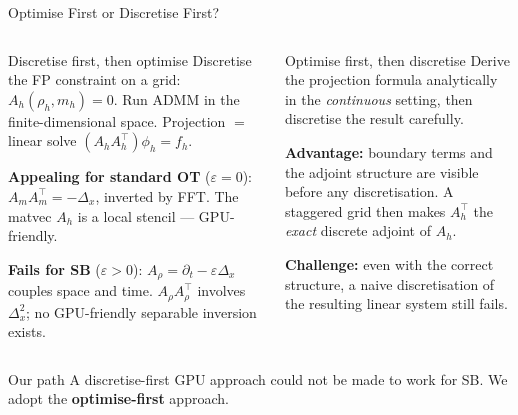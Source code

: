 \documentclass[10pt,aspectratio=169]{beamer}
\newcommand{\eps}{\varepsilon}
\newcommand{\Lapx}{\Delta_x}          %
\newcommand{\Bihar}{\Delta_x^2}       %
\begin{document}
\begin{frame}{Optimise First or Discretise First?}
  \begin{columns}[T]
    \begin{block}{Discretise first, then optimise}
      Discretise the FP constraint on a grid: $A_h(\rho_h,m_h)=0$.
      Run ADMM in the finite-dimensional space.
      Projection $=$ linear solve $(A_hA_h^\top)\phi_h = f_h$.

      \smallskip
      \textbf{Appealing for standard OT} ($\eps=0$):
      $A_m A_m^\top = -\Lapx$, inverted by FFT.
      The matvec $A_h$ is a local stencil --- GPU-friendly.

      \smallskip
      \textbf{Fails for SB} ($\eps>0$): $A_\rho = \partial_t - \eps\Lapx$
      couples space and time.  $A_\rho A_\rho^\top$ involves $\Bihar$;
      no GPU-friendly separable inversion exists.
    \end{block}

    \begin{block}{Optimise first, then discretise}
      Derive the projection formula analytically in the
      \emph{continuous} setting, then discretise the result carefully.

      \smallskip
      \textbf{Advantage:} boundary terms and the adjoint structure
      are visible before any discretisation.
      A staggered grid then makes $A_h^\top$ the \emph{exact}
      discrete adjoint of $A_h$.

      \smallskip
      \textbf{Challenge:} even with the correct structure, a naive
      discretisation of the resulting linear system still fails.
    \end{block}
  \end{columns}

  \medskip
  \begin{alertblock}{Our path}
    A discretise-first GPU approach could not be made to work for SB.
    We adopt the \textbf{optimise-first} approach.
  \end{alertblock}
\end{frame}
\end{document}
